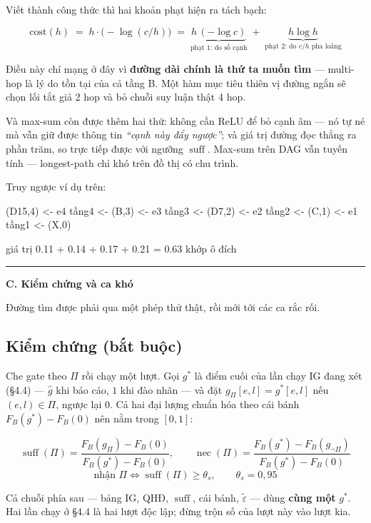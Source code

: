 \documentclass[11pt,a4paper]{article}
\DeclareMathOperator{\suff}{suff}
\DeclareMathOperator{\nec}{nec}
\begin{document}
Viết thành công thức thì hai khoản phạt hiện ra tách bạch:

\[ \mathrm{cost}(h)\;=\;h\cdot\big(-\log(c/h)\big)
   \;=\;\underbrace{h\,(-\log c)}_{\text{phạt 1: do số cạnh}}
   \;+\;\underbrace{h\log h}_{\text{phạt 2: do } c/h \text{ pha loãng}} \]

Điều này chí mạng ở đây vì \textbf{đường dài chính là thứ ta muốn tìm} --- multi-hop là lý
do tồn tại của cả tầng B. Một hàm mục tiêu thiên vị đường ngắn sẽ chọn lối tắt giả 2 hop và
bỏ chuỗi suy luận thật 4 hop.

Và max-sum còn được thêm hai thứ: không cần ReLU để bỏ cạnh âm --- nó tự né mà vẫn giữ
được thông tin \emph{``cạnh này đẩy ngược''}; và giá trị đường đọc thẳng ra phần trăm, so
trực tiếp được với ngưỡng $\suff$. Max-sum trên DAG vẫn tuyến tính --- longest-path chỉ khó
trên đồ thị có chu trình.

Truy ngược ví dụ trên:

\begin{dia}
(D15,4) <- e4 tầng4 <- (B,3) <- e3 tầng3 <- (D7,2) <- e2 tầng2 <- (C,1)
        <- e1 tầng1 <- (X,0)

giá trị  0.11 + 0.14 + 0.17 + 0.21 = 0.63      khớp ô đích
\end{dia}

\bigskip\noindent\rule{\linewidth}{0.8pt}\par\smallskip
\noindent\textbf{C. Kiểm chứng và ca khó}

Đường tìm được phải qua một phép thử thật, rồi mới tới các ca rắc rối.

\subsection{Kiểm chứng (bắt buộc)}

Che gate theo $\Pi$ rồi chạy một lượt. Gọi $g^\ast$ là điểm cuối của lần chạy IG đang xét
(\S4.4) --- $\hat g$ khi báo cáo, $1$ khi đào nhãn --- và đặt $g_\Pi[e,l]=g^\ast[e,l]$ nếu
$(e,l)\in\Pi$, ngược lại $0$. Cả hai đại lượng chuẩn hóa theo cái bánh
$F_B(g^\ast)-F_B(0)$ nên nằm trong $[0,1]$:

\[
\suff(\Pi)=\frac{F_B(g_\Pi)-F_B(0)}{F_B(g^\ast)-F_B(0)},
\qquad
\nec(\Pi)=\frac{F_B(g^\ast)-F_B(g_{\neg\Pi})}{F_B(g^\ast)-F_B(0)}
\]
\[ \text{nhận } \Pi \iff \suff(\Pi)\ge\theta_s, \qquad \theta_s=0{,}95 \]

Cả chuỗi phía sau --- bảng IG, QHĐ, $\suff$, cái bánh, $\tilde\varepsilon$ --- dùng
\textbf{cùng một} $g^\ast$. Hai lần chạy ở \S4.4 là hai lượt độc lập; đừng trộn số của lượt
này vào lượt kia.
\end{document}
